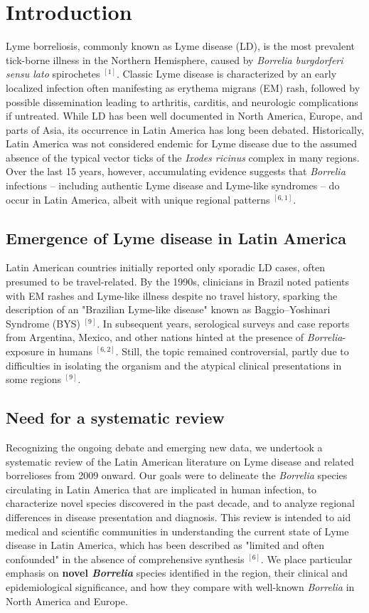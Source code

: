 \documentclass[11pt,letterpaper]{article}
\newcommand{\mycite}[1]{$^{[#1]}$}
\begin{document}
\vspace{0.5cm}
\section{Introduction}
Lyme borreliosis, commonly known as Lyme disease (LD), is the most prevalent tick-borne illness in the Northern Hemisphere, caused by \textit{Borrelia burgdorferi sensu lato} spirochetes \mycite{1}. Classic Lyme disease is characterized by an early localized infection often manifesting as erythema migrans (EM) rash, followed by possible dissemination leading to arthritis, carditis, and neurologic complications if untreated. While LD has been well documented in North America, Europe, and parts of Asia, its occurrence in Latin America has long been debated. Historically, Latin America was not considered endemic for Lyme disease due to the assumed absence of the typical vector ticks of the \textit{Ixodes ricinus} complex in many regions. Over the last 15 years, however, accumulating evidence suggests that \textit{Borrelia} infections – including authentic Lyme disease and Lyme-like syndromes – do occur in Latin America, albeit with unique regional patterns \mycite{6, 1}.

\subsection{Emergence of Lyme disease in Latin America}
Latin American countries initially reported only sporadic LD cases, often presumed to be travel-related. By the 1990s, clinicians in Brazil noted patients with EM rashes and Lyme-like illness despite no travel history, sparking the description of an "Brazilian Lyme-like disease" known as Baggio–Yoshinari Syndrome (BYS) \mycite{9}. In subsequent years, serological surveys and case reports from Argentina, Mexico, and other nations hinted at the presence of \textit{Borrelia}-exposure in humans \mycite{6, 2}. Still, the topic remained controversial, partly due to difficulties in isolating the organism and the atypical clinical presentations in some regions \mycite{9}.

\subsection{Need for a systematic review}
Recognizing the ongoing debate and emerging new data, we undertook a systematic review of the Latin American literature on Lyme disease and related borrelioses from 2009 onward. Our goals were to delineate the \textit{Borrelia} species circulating in Latin America that are implicated in human infection, to characterize novel species discovered in the past decade, and to analyze regional differences in disease presentation and diagnosis. This review is intended to aid medical and scientific communities in understanding the current state of Lyme disease in Latin America, which has been described as "limited and often confounded" in the absence of comprehensive synthesis \mycite{6}. We place particular emphasis on \textbf{novel \textit{Borrelia}} species identified in the region, their clinical and epidemiological significance, and how they compare with well-known \textit{Borrelia} in North America and Europe.
\end{document}
